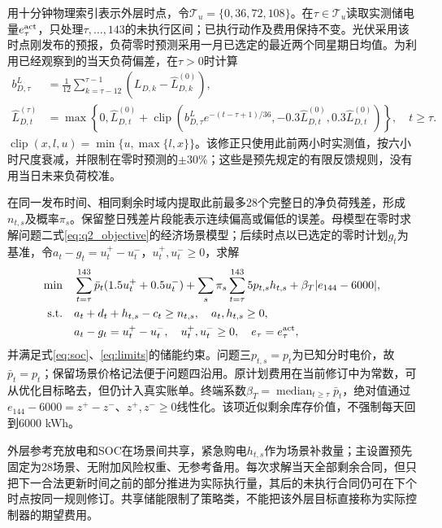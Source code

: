 用十分钟物理索引表示外层时点，令$\mathcal T_u=\{0,36,72,108\}$。在$\tau\in\mathcal T_u$读取实测储电量$e_\tau^{\rm act}$，只处理$\tau,\ldots,143$的未执行区间；已执行动作及费用保持不变。光伏采用该时点刚发布的预报，负荷零时预测采用一月已选定的最近两个同星期日均值。为利用已经观察到的当天负荷偏差，在$\tau>0$时计算
\begin{align}
 b^L_{D,\tau}&=\frac{1}{12}\sum_{k=\tau-12}^{\tau-1}
       (L_{D,k}-\widehat L^{(0)}_{D,k}),\label{eq:q3_load_bias}\\
 \widehat L^{(\tau)}_{D,t}&=\max\left\{0,\widehat L^{(0)}_{D,t}+
 \operatorname{clip}\!\left(b^L_{D,\tau}e^{-(t-\tau+1)/36},
       -0.3\widehat L^{(0)}_{D,t},0.3\widehat L^{(0)}_{D,t}\right)\right\},\quad t\ge\tau.
 \label{eq:q3_load_update}
\end{align}
$\operatorname{clip}(x,l,u)=\min\{u,\max\{l,x\}\}$。该修正只使用此前两小时实测值，按六小时尺度衰减，并限制在零时预测的$\pm30\%$；这些是预先规定的有限反馈规则，没有用当日未来负荷校准。

在同一发布时间、相同剩余时域内提取此前最多28个完整日的净负荷残差，形成$n_{t,s}$及概率$\pi_s$。保留整日残差片段能表示连续偏高或偏低的误差。母模型在零时求解问题二式\eqref{eq:q2_objective}的经济场景模型；后续时点以已选定的零时计划$g_t$为基准，令$a_t-g_t=u_t^+-u_t^-$，$u_t^+,u_t^-\ge0$，求解
\begin{align}
 \min\quad &\sum_{t=\tau}^{143}\bar p_t(1.5u_t^++0.5u_t^-)
 +\sum_s\pi_s\sum_{t=\tau}^{143}5p_{t,s}h_{t,s}
 +\beta_T|e_{144}-6000|,\label{eq:q3_revision_objective}\\
 \text{s.t.}\quad&a_t+d_t+h_{t,s}-c_t\ge n_{t,s},\quad a_t,h_{t,s}\ge0,
                    \label{eq:q3_revision_balance}\\
 &a_t-g_t=u_t^+-u_t^-,\quad u_t^+,u_t^-\ge0,\quad
 e_\tau=e_\tau^{\rm act},\label{eq:q3_revision_contract}
\end{align}
并满足式\eqref{eq:soc}、\eqref{eq:limits}的储能约束。问题三$p_{t,s}=p_t$为已知分时电价，故$\bar p_t=p_t$；保留场景价格记法便于问题四沿用。原计划费用在当前修订中为常数，可从优化目标略去，但仍计入真实账单。终端系数$\beta_T=\operatorname{median}_{t\ge\tau}\bar p_t$，绝对值通过$e_{144}-6000=z^+-z^-$、$z^+,z^-\ge0$线性化。该项近似剩余库存价值，不强制每天回到6000 kWh。

外层参考充放电和SOC在场景间共享，紧急购电$h_{t,s}$作为场景补救量；主设置预先固定为28场景、无附加风险权重、无参考备用。每次求解当天全部剩余合同，但只把下一合法更新时间之前的部分推进为实际执行量，其后的未执行合同仍可在下个时点按同一规则修订。共享储能限制了策略类，不能把该外层目标直接称为实际控制器的期望费用。


